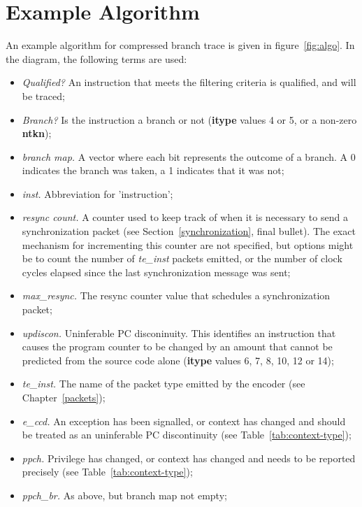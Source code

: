 \chapter{Example Algorithm} \label{Algorithm}

An example algorithm for compressed branch trace is given in figure~\ref{fig:algo}. 
In the diagram, the following terms are used:

\begin{itemize}
  \item \textit{Qualified?}  An instruction that meets the filtering criteria is qualified, and will be traced;
  \item \textit{Branch?} Is the instruction a branch or not (\textbf{itype} values 4 or 5, or a non-zero \textbf{ntkn});
  \item \textit{branch map.}  A vector where each bit represents the outcome of a branch.  A 0 indicates the
    branch was taken, a 1 indicates that it was not;
  \item \textit{inst.}  Abbreviation for 'instruction';
  \item \textit{resync count.} A counter used to keep track of when it is necessary to send 
    a synchronization packet (see Section~\ref{synchronization}, final bullet). The exact mechanism for 
    incrementing this counter are not specified, but options might be to count the number of \textit{te\_inst} packets emitted, 
    or the number of clock cycles elapsed since the last synchronization message was sent;
  \item \textit{max\_resync.}  The resync counter value that schedules a synchronization packet;
  \item \textit{updiscon.}  Uninferable PC disconinuity.  This identifies an instruction that
    causes the program counter to be changed by an amount that cannot be predicted from the
    source code alone (\textbf{itype} values 6, 7, 8, 10, 12 or 14);
   \item \textit{te\_inst.} The name of the packet type emitted by the encoder (see Chapter~\ref{packets});
   \item \textit{e\_ccd.} An exception has been signalled, or context has changed and
     should be treated as an uninferable PC discontinuity (see Table~\ref{tab:context-type});
   \item \textit{ppch.} Privilege has changed, or context has changed and needs to be 
     reported precisely (see Table~\ref{tab:context-type});
   \item \textit{ppch\_br.} As above, but branch map not empty;

\end{itemize}
